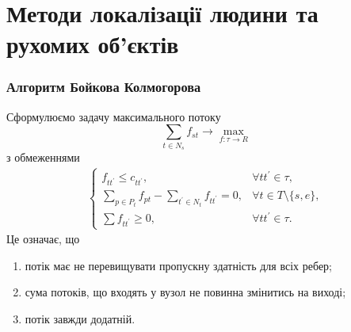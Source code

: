\section{Методи локалізації людини та рухомих об'єктів}
\begin{frame}
  \frametitle{Алгоритм Бойкова Колмогорова}

  Сформулюємо задачу максимального потоку
  \begin{equation*}
    \sum_{t \in N_s} f_{st} \rightarrow \max_{f: \tau \rightarrow R }
  \end{equation*}
  з обмеженнями
  \begin{equation*}
    \begin{gathered}
      \begin{cases}
        f_{tt^{'}} \leq  c_{tt^{'}},                                   & \forall tt^{'}  \in \tau ,         \\
        \sum_{p \in P_t} f_{pt} - \sum_{t^{'} \in N_t} f_{tt^{'}} = 0, & \forall t \in T \setminus \{s,e\}, \\
        \sum f_{tt^{'}} \geq 0,                                        & \forall tt^{'}  \in \tau.
      \end{cases}
    \end{gathered}
  \end{equation*}
  Це означає, що
  \begin{enumerate}
    \item потік має не перевищувати пропускну здатність для всіх ребер;
    \item сума потоків, що входять у вузол не повинна змінитись на виході;
    \item потік завжди додатній.
  \end{enumerate}
\end{frame}
